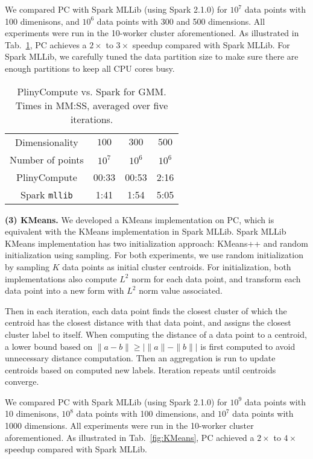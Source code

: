 We compared PC with Spark MLLib (using Spark 2.1.0) for $10^7$ data
points with 100 dimenisons, and $10^6$ data points with 300 and 500
dimensions. All experiments were run in the 10-worker cluster aforementioned. 
As illustrated in Tab.~\ref{fig:Gmm}, PC achieves a $2\times$ to
$3\times$ speedup compared with Spark MLLib. For Spark MLLib, we
carefully tuned the data partition size to make sure there are enough
partitions to keep all CPU cores busy.

\begin{table}[h!]
\begin{center}
\begin{tabular}{|c||c|c|c||}
\hline
Dimensionality & $100$ & $300$ & $500$ \\
Number of points & $10^7$ & $10^6$ & $10^6$ \\
\hline
\hline
PlinyCompute &00:33 & 00:53 & 2:16 \\
Spark \texttt{mllib} &1:41  &1:54 &5:05 \\
\hline
\end{tabular}
\caption{PlinyCompute vs. Spark for GMM. Times in MM:SS, averaged over five iterations.}
\label{fig:Gmm}
\end{center}
\end{table}
\vspace{-10pt}


\vspace{5pt}
\noindent
\textbf {(3) KMeans.} We developed a KMeans implementation on PC, which
is equivalent with the KMeans implementation in Spark MLLib. Spark
MLLib KMeans implementation has two initialization approach: KMeans++
and random initialization using sampling. For both experiments, we use
random initialization by sampling $K$ data points as initial
cluster centroids. For initialization, both implementations also compute $L^2$ norm for each data
point, and transform each data point into a new form with $L^2$ norm value
associated. 

Then in each iteration, each data point finds the closest cluster
of which the centroid has the closest distance with that data point, and assigns the closest
cluster label to itself. When computing the distance of a data point to a
centroid, a lower bound based on $\|a - b\| \geq |\|a\| - \|b\||$ is
first computed to avoid unnecessary distance computation. Then an aggregation is run to update centroids
based on computed new labels. Iteration repeats until centroids
converge.


We compared PC with Spark MLLib (using Spark 2.1.0) for $10^9$ data
points with 10 dimenisons, $10^8$ data points with 100 dimensions,  and $10^7$
data points with 1000
dimensions. All experiments were run in the 10-worker cluster aforementioned. 
As illustrated in Tab.~\ref{fig:KMeans}, PC achieved a $2\times$ to
$4\times$ speedup compared with Spark MLLib. 


